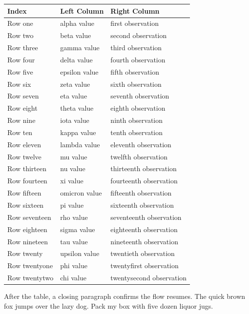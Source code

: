\documentclass[acmsmall,nonacm]{acmart}
\begin{document}
\begin{center}
\begin{tabular}{lll}
\toprule
Index & Left Column & Right Column \\
\midrule
Row one & alpha value & first observation \\
Row two & beta value & second observation \\
Row three & gamma value & third observation \\
Row four & delta value & fourth observation \\
Row five & epsilon value & fifth observation \\
Row six & zeta value & sixth observation \\
Row seven & eta value & seventh observation \\
Row eight & theta value & eighth observation \\
Row nine & iota value & ninth observation \\
Row ten & kappa value & tenth observation \\
Row eleven & lambda value & eleventh observation \\
Row twelve & mu value & twelfth observation \\
Row thirteen & nu value & thirteenth observation \\
Row fourteen & xi value & fourteenth observation \\
Row fifteen & omicron value & fifteenth observation \\
Row sixteen & pi value & sixteenth observation \\
Row seventeen & rho value & seventeenth observation \\
Row eighteen & sigma value & eighteenth observation \\
Row nineteen & tau value & nineteenth observation \\
Row twenty & upsilon value & twentieth observation \\
Row twentyone & phi value & twentyfirst observation \\
Row twentytwo & chi value & twentysecond observation \\
\bottomrule
\end{tabular}
\end{center}

After the table, a closing paragraph confirms the flow resumes. The quick brown
fox jumps over the lazy dog. Pack my box with five dozen liquor jugs.
\end{document}
